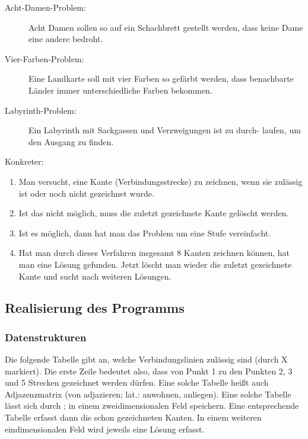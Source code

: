 \documentclass{lehramt-informatik}
\begin{document}
\begin{description}
\item[Acht-Damen-Problem:] Acht Damen sollen so auf ein Schachbrett
gestellt werden, dass keine Dame eine andere bedroht.

\item[Vier-Farben-Problem:] Eine Landkarte soll mit vier Farben so
gefärbt werden, dass benachbarte Länder immer unterschiedliche Farben
bekommen.

\item[Labyrinth-Problem:] Ein Labyrinth mit Sackgassen und Verzweigungen
ist zu durch- laufen, um den Ausgang zu finden.
\end{description}

\noindent
Konkreter:

\begin{enumerate}
\item Man versucht, eine Kante (Verbindungsstrecke) zu zeichnen, wenn
sie zulässig ist oder noch nicht gezeichnet wurde.

\item Ist das nicht möglich, muss die zuletzt gezeichnete Kante gelöscht
werden.

\item  Ist es möglich, dann hat man das Problem um eine Stufe
vereinfacht.

\item  Hat man durch dieses Verfahren insgesamt 8 Kanten zeichnen
können, hat man eine Lösung gefunden. Jetzt löscht man wieder die
zuletzt gezeichnete Kante und sucht nach weiteren Lösungen.
\end{enumerate}

\subsection{Realisierung des Programms}

\subsubsection{Datenstrukturen}

Die folgende Tabelle gibt an, welche Verbindungslinien zulässig sind
(durch X markiert). Die erste Zeile bedeutet also, dass von Punkt 1 zu
den Punkten 2, 3 und 5 Strecken gezeichnet werden dürfen. Eine solche
Tabelle heißt auch Adjazenzmatrix (von adjazieren; lat.: anwohnen,
anliegen). Eine solche Tabelle lässt sich durch ; in einem zweidimensionalen Feld speichern. Eine
entsprechende Tabelle  erfasst dann die
schon gezeichneten Kanten. In einem weiteren eindimensionalen Feld
wird jeweils eine Lösung erfasst.
\end{document}
